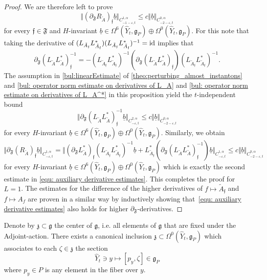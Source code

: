 \documentclass[11pt,a4paper]{scrartcl}
\newcommand{\id}{\textup{id}}
\newcommand{\VertWHt}[3]{\Vert_{C^{{#1},\alpha}_{{#2},t}{#3}}}
\numberwithin{equation}{section}
\theoremstyle{plain}
\theoremstyle{definition}
\theoremstyle{remark}
\begin{document}
\begin{proof}
We are therefore left to prove \[\Vert (\partial_\mathfrak{F} R_{\tilde{A}})_{\mathfrak{f}} \underline{b}\VertWHt{1}{-1-\varepsilon}{}\leq c \Vert \underline{b}\VertWHt{0}{-2-\varepsilon}{} \] for every ${\mathfrak{f}}\in \mathfrak{F}$ and $H$-invariant $\underline{b}\in \Omega^6(\hat{Y}_t,\mathfrak{g}_P)\oplus \Omega^0(\hat{Y}_t,\mathfrak{g}_P)$. For this note that taking the derivative of $(L_{\tilde{A}_{\mathfrak{f}}} L_{\tilde{A}_{\mathfrak{f}}}^*)(L_{\tilde{A}_{\mathfrak{f}}}L_{\tilde{A}_{\mathfrak{f}}}^*)^{-1} = \id$ implies that \[ \partial_\mathfrak{F} (L_{\tilde{A}} L_{\tilde{A}}^*)_{\mathfrak{f}}^{-1} = - (L_{\tilde{A}_{\mathfrak{f}}} L_{\tilde{A}_{\mathfrak{f}}}^*)^{-1} (\partial_\mathfrak{F}(L_{\tilde{A}} L_{\tilde{A}}^*)_{\mathfrak{f}})(L_{\tilde{A}_{\mathfrak{f}}} L_{\tilde{A}_{\mathfrak{f}}}^*)^{-1}. \] The assumption in \autoref{bul:linearEstimate} of \autoref{theo:perturbing_almost_instantons} and \autoref{bul: operator norm estimate on derivatives of L_A} and \autoref{bul: operator norm estimate on derivatives of L_A^*} in this proposition yield the $t$-independent bound \[ \Vert \partial_\mathfrak{F} (L_{\tilde{A}} L_{\tilde{A}}^*)_{\mathfrak{f}}^{-1} \underline{b} \VertWHt{2}{-\varepsilon}{} \leq c \Vert \underline{b} \VertWHt{0}{-2-\varepsilon}{} \] for every $H$-invariant $\underline{b}\in \Omega^6(\hat{Y}_t,\mathfrak{g}_P)\oplus \Omega^0(\hat{Y}_t,\mathfrak{g}_P)$. Similarly, we obtain \[ \Vert \partial_\mathfrak{F} (R_{\tilde{A}})_{\mathfrak{f}}\underline{b} \VertWHt{1}{-\varepsilon}{} = \Vert (\partial_\mathfrak{F} L_{\tilde{A}}^*)_{\mathfrak{f}}(L_{\tilde{A}_{\mathfrak{f}}} L_{\tilde{A}_{\mathfrak{f}}}^*)^{-1}\underline{b} + L_{\tilde{A}_{\mathfrak{f}}}^*(\partial_\mathfrak{F}(L_{\tilde{A}} L_{\tilde{A}}^*)_{\mathfrak{f}}^{-1})\underline{b} \VertWHt{1}{-\varepsilon}{} \leq c \Vert \underline{b} \VertWHt{0}{-2-\varepsilon}{} \] for every $H$-invariant $\underline{b}\in \Omega^6(\hat{Y}_t,\mathfrak{g}_P)\oplus \Omega^0(\hat{Y}_t,\mathfrak{g}_P)$ which is exactly the second estimate in \eqref{equ: auxiliary derivative estimates}. This completes the proof for $L=1$. The estimates for the difference of the higher derivatives of $f \mapsto \tilde{A}_{\mathfrak{f}}$ and $f\mapsto A_f$ are proven in a similar way by inductively showing that~\eqref{equ: auxiliary derivative estimates} also holds for higher  $\partial_\mathfrak{F}$-derivatives.
\end{proof}

Denote by $\mathfrak{z} \subset \mathfrak{g}$ the center of $\mathfrak{g}$, i.e. all elements of $\mathfrak{g}$ that are fixed under the Adjoint-action. There exists a canonical inclusion $\mathfrak{z} \subset \Omega^0(\hat{Y}_t,\mathfrak{g}_P)$ which associates to each $\zeta \in \mathfrak{z}$ the section \[ \hat{Y}_t \ni y \mapsto [p_y,\zeta] \in \mathfrak{g}_P \] where $p_y \in P$ is any element in the fiber over $y$.
\end{document}
